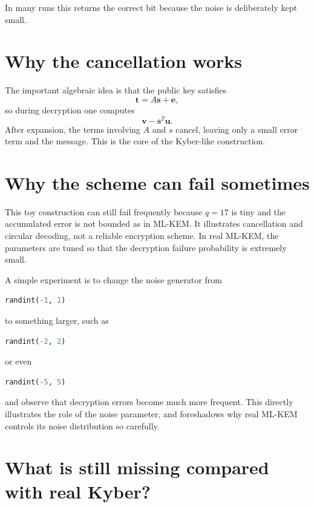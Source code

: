 In many runs this returns the correct bit because the noise is deliberately kept small.

\section{Why the cancellation works}

The important algebraic idea is that the public key satisfies
\[
\mathbf{t} = A\mathbf{s}+\mathbf{e},
\]
so during decryption one computes
\[
\mathbf{v} - \mathbf{s}^T\mathbf{u}.
\]
After expansion, the terms involving $A$ and $s$ cancel, leaving only a small error term and the message. This is the core of the Kyber-like construction.

\section{Why the scheme can fail sometimes}

This toy construction can still fail frequently because $q=17$ is tiny and the accumulated error is not bounded as in ML-KEM. It illustrates cancellation and circular decoding, not a reliable encryption scheme. In real ML-KEM, the parameters are tuned so that the decryption failure probability is extremely small.

A simple experiment is to change the noise generator from

\begin{lstlisting}[language=Python]
randint(-1, 1)
\end{lstlisting}

to something larger, such as

\begin{lstlisting}[language=Python]
randint(-2, 2)
\end{lstlisting}

or even

\begin{lstlisting}[language=Python]
randint(-5, 5)
\end{lstlisting}

and observe that decryption errors become much more frequent. This directly illustrates the role of the noise parameter, and foreshadows why real ML-KEM controls its noise distribution so carefully.

\section{What is still missing compared with real Kyber?}

